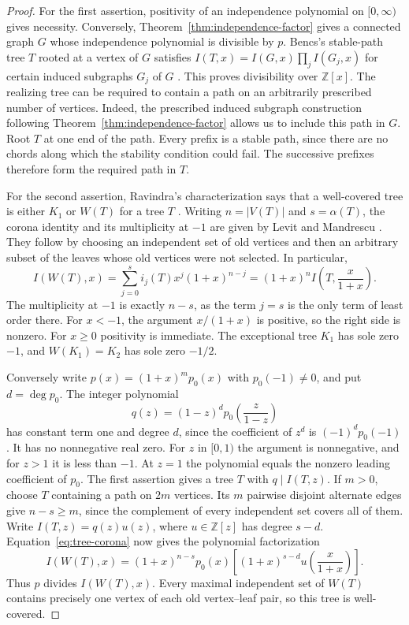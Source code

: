 \documentclass[11pt,a4paper]{article}
\begin{document}
\begin{proof}
For the first assertion, positivity of an independence polynomial on
$[0,\infty)$ gives necessity. Conversely, Theorem~\ref{thm:independence-factor}
gives a connected graph $G$ whose independence polynomial is divisible
by $p$. Bencs's stable-path tree $T$ rooted at a vertex of $G$ satisfies
$I(T,x)=I(G,x)\prod_j I(G_j,x)$ for certain induced subgraphs $G_j$ of
$G$ \cite[Proposition~2.7]{bencs}. This proves divisibility over
$\mathbb Z[x]$. The realizing tree can be required to contain a path on
an arbitrarily prescribed number of vertices. Indeed, the prescribed
induced subgraph construction following Theorem~\ref{thm:independence-factor}
allows us to include this path in $G$. Root $T$ at one end of the path.
Every prefix is a stable path, since there are no chords along which
the stability condition could fail. The successive prefixes therefore
form the required path in $T$.

For the second assertion, Ravindra's characterization says that a
well-covered tree is either $K_1$ or $W(T)$ for a tree $T$ \cite{ravindra}.
Writing $n=|V(T)|$ and $s=\alpha(T)$, the corona identity and its
multiplicity at $-1$ are given by Levit and Mandrescu \cite{levitcorona}.
They follow by choosing an independent set of old vertices and then an
arbitrary subset of the leaves whose old vertices were not selected.
In particular,
\begin{equation}\label{eq:tree-corona}
 I(W(T),x)=\sum_{j=0}^{s} i_j(T)x^j(1+x)^{n-j}
          =(1+x)^n I\!\left(T,\frac{x}{1+x}\right).
\end{equation}
The multiplicity at $-1$ is exactly $n-s$, as the term $j=s$ is the
only term of least order there. For $x<-1$, the argument $x/(1+x)$
is positive, so the right side is nonzero. For $x\ge0$ positivity is
immediate. The exceptional tree $K_1$ has sole zero $-1$, and
$W(K_1)=K_2$ has sole zero $-1/2$.

Conversely write $p(x)=(1+x)^m p_0(x)$ with $p_0(-1)\ne0$, and put
$d=\deg p_0$. The integer polynomial
\[
 q(z)=(1-z)^d p_0\!\left(\frac{z}{1-z}\right)
\]
has constant term one and degree $d$, since the coefficient of $z^d$
is $(-1)^d p_0(-1)$. It has no nonnegative real zero. For $z$ in
$[0,1)$ the argument is nonnegative, and for $z>1$ it is less than
$-1$. At $z=1$ the polynomial equals the nonzero leading coefficient
of $p_0$. The first assertion gives a tree $T$ with $q\mid I(T,z)$.
If $m>0$, choose $T$ containing a path on $2m$ vertices. Its $m$
pairwise disjoint alternate edges give $n-s\ge m$, since the complement
of every independent set covers all of them. Write $I(T,z)=q(z)u(z)$,
where $u\in\mathbb Z[z]$ has degree $s-d$. Equation~\eqref{eq:tree-corona}
now gives the polynomial factorization
\[
 I(W(T),x)=(1+x)^{n-s}p_0(x)
       \left[(1+x)^{s-d}u\!\left(\frac{x}{1+x}\right)\right].
\]
Thus $p$ divides $I(W(T),x)$. Every maximal independent set of $W(T)$
contains precisely one vertex of each old vertex--leaf pair, so this
tree is well-covered.
\end{proof}
\end{document}
